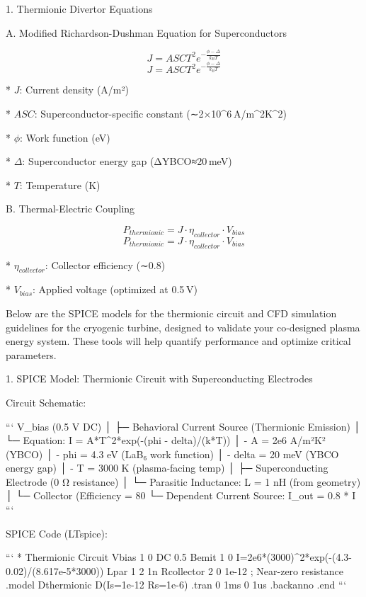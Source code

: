 \documentclass{article}%
\begin{document}
1.  Thermionic Divertor Equations

A. Modified Richardson-Dushman Equation for Superconductors

$$
J = A S C T^2 e^{-\frac{\phi - \Delta}{k_B T}}
$$
$$
J = A S C T^2 e^{-\frac{\phi - \Delta}{k_B T}}
$$

    *   \( J \): Current density (A/m²)

    *   \( A S C \): Superconductor-specific constant (∼2×10^6 A/m^2K^2)

    *   \( \phi \): Work function (eV)

    *   \( \Delta \): Superconductor energy gap (ΔYBCO≈20 meV)

    *   \( T \): Temperature (K)

B. Thermal-Electric Coupling

$$
P_{thermionic} = J \cdot \eta_{collector} \cdot V_{bias}
$$
$$
P_{thermionic} = J \cdot \eta_{collector} \cdot V_{bias}
$$

    *   \( \eta_{collector} \): Collector efficiency (∼0.8)

    *   \( V_{bias} \): Applied voltage (optimized at 0.5 V)

Below are the SPICE models for the thermionic circuit and CFD simulation guidelines for the cryogenic turbine, designed to validate your co-designed plasma energy system. These tools will help quantify performance and optimize critical parameters.

1.  SPICE Model: Thermionic Circuit with Superconducting Electrodes

Circuit Schematic:

```
V_bias (0.5 V DC)
│
├─ Behavioral Current Source (Thermionic Emission)
│   └─ Equation: I = A*T^2*exp(-(phi - delta)/(k*T))
│       - A = 2e6 A/m²K² (YBCO)
│       - phi = 4.3 eV (LaB₆ work function)
│       - delta = 20 meV (YBCO energy gap)
│       - T = 3000 K (plasma-facing temp)
│
├─ Superconducting Electrode (0 Ω resistance)
│   └─ Parasitic Inductance: L = 1 nH (from geometry)
│
└─ Collector (Efficiency = 80%
    └─ Dependent Current Source: I_out = 0.8 * I
```

SPICE Code (LTspice):

```
* Thermionic Circuit
Vbias 1 0 DC 0.5
Bemit 1 0 I=2e6*(3000)^2*exp(-(4.3-0.02)/(8.617e-5*3000))
Lpar 1 2 1n
Rcollector 2 0 1e-12 ; Near-zero resistance
.model Dthermionic D(Is=1e-12 Rs=1e-6)
.tran 0 1ms 0 1us
.backanno
.end
```
\end{document}
